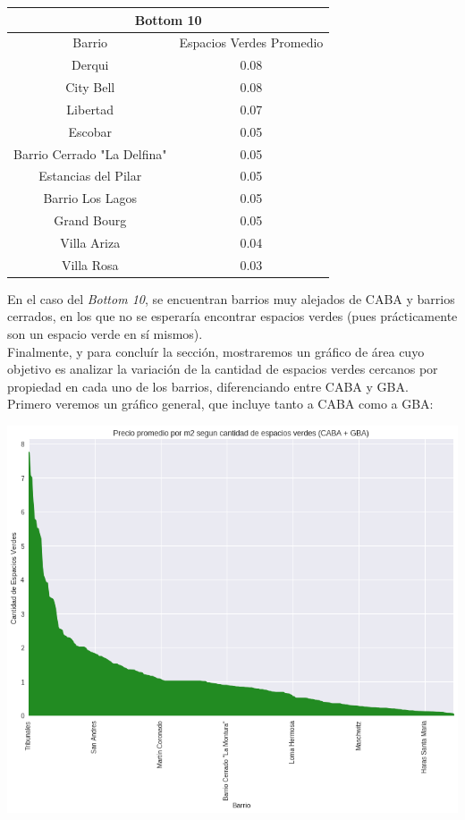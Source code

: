 \documentclass[a4paper, 10pt]{article}
\newcommand\tab[1][0.5cm]{\hspace*{#1}}
\begin{document}
				\begin{center}
					\begin{tabular}{ |c|c| }
						\hline
						\multicolumn{2}{|c|}{Bottom 10}\\
						\hline
						\hline
						Barrio & Espacios Verdes Promedio\\
						\hline
						Derqui & 0.08 \\
						City Bell & 0.08 \\
						Libertad & 0.07 \\
						Escobar & 0.05 \\
						Barrio Cerrado "La Delfina" & 0.05 \\
						Estancias del Pilar & 0.05 \\
						Barrio Los Lagos & 0.05 \\
						Grand Bourg & 0.05 \\
						Villa Ariza & 0.04 \\
						Villa Rosa & 0.03\\
						\hline
					\end{tabular}
				\end{center}
				\tab En el caso del \emph{Bottom 10}, se encuentran barrios muy alejados de CABA y barrios cerrados, en los que no
				se esperaría encontrar espacios verdes (pues prácticamente son un espacio verde en sí mismos). \\
				\tab Finalmente, y para concluír la sección, mostraremos un gráfico de área cuyo objetivo es analizar la variación
				de la cantidad de espacios verdes cercanos por propiedad en cada uno de los barrios, diferenciando entre CABA y GBA. \\
				\tab Primero veremos un gráfico general, que incluye tanto a CABA como a GBA:
				\begin{center}
					\includegraphics[width=\textwidth]{images/parksVariationByHood}
				\end{center}
\end{document}
